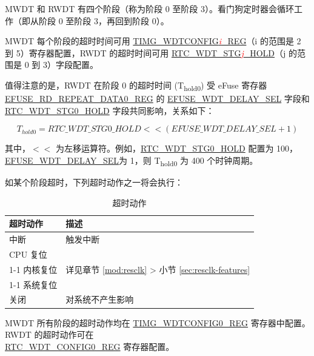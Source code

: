 \documentclass[main\_\_CN.tex]{subfiles}
\begin{document}
MWDT 和 RWDT 有四个阶段（称为阶段 0 至阶段 3）。看门狗定时器会循环工作（即从阶段 0 至阶段 3，再回到阶段 0）。

MWDT 每个阶段的超时时间可用 \hyperref[regdesc:TIMGWDTCONFIG2REG]{TIMG\_WDTCONFIG\textcolor{red}{\it{i}}\_REG}（i 的范围是 2 到 5）寄存器配置，RWDT 的超时时间可用 \hyperref[fielddesc:RTCWDTSTG3HOLD]{RTC\_WDT\_STG\textcolor{red}{\it{j}}\_HOLD}（j 的范围是 0 到 3）字段配置。

值得注意的是，RWDT 在阶段 0 的超时时间 (T\textsubscript{hold0}) 受 eFuse 寄存器 \hyperref[regdesc:EFUSERDREPEATDATA0REG]{EFUSE\_RD\_REPEAT\_DATA0\_REG} 的 \hyperref[fielddesc:EFUSEWDTDELAYSEL]{EFUSE\_WDT\_DELAY\_SEL} 字段和 \hyperref[fielddesc:RTCWDTSTG0HOLD]{RTC\_WDT\_STG0\_HOLD} 字段共同影响，关系如下：

\begin{displaymath}
T_{hold0} = \hyperref[fielddesc:RTCWDTSTG0HOLD]{RTC\_WDT\_STG0\_HOLD}   << (\hyperref[fielddesc:EFUSEWDTDELAYSEL]{EFUSE\_WDT\_DELAY\_SEL} + 1)
\end{displaymath}

其中，$<<$ 为左移运算符。例如，\hyperref[fielddesc:RTCWDTSTG0HOLD]{RTC\_WDT\_STG0\_HOLD} 配置为 100，\hyperref[fielddesc:EFUSEWDTDELAYSEL]{EFUSE\_WDT\_DELAY\_SEL}为 1，则 T\textsubscript{hold0} 为 400 个时钟周期。

如某个阶段超时，下列超时动作之一将会执行：

\begin{table}[H]
\centering
\caption{超时动作}
\label{tab:wdt-timeout-action}

\begin{tabular}{|l|m{12cm}|}
\hline
\rowcolor{lightgray}
    \textbf{超时动作} & \textbf{描述} \\\hline

    中断 &  触发中断 \\ \hline
    CPU 复位 &  \multirow{3}{=}{详见章节 \ref{mod:resclk} \textit{\nameref{mod:resclk}} > 小节 \ref{sec:resclk-features} \textit{\nameref{sec:resclk-features}}}\\ \cline{1-1}
    内核复位 &  \\ \cline{1-1}
    系统复位 &  \\ \hline
    关闭 &  对系统不产生影响\\ \hline

\end{tabular}
\end{table}

MWDT 所有阶段的超时动作均在 \hyperref[regdesc:TIMGWDTCONFIG0REG]{TIMG\_WDTCONFIG0\_REG} 寄存器中配置。RWDT 的超时动作可在\\ \hyperref[regdesc:RTCWDTCONFIG0REG]{RTC\_WDT\_CONFIG0\_REG} 寄存器配置。
\end{document}

